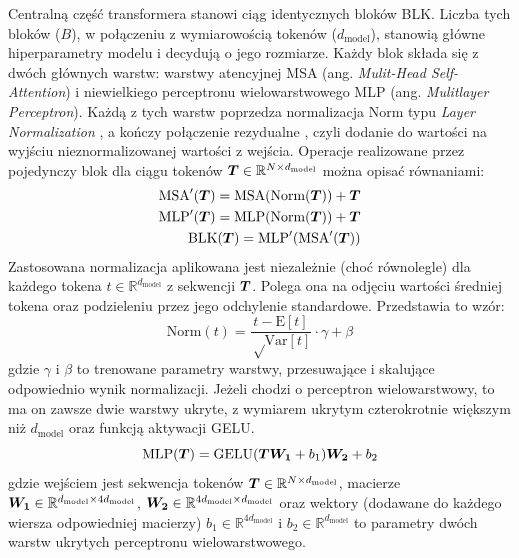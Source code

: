 Centralną część transformera stanowi ciąg identycznych bloków BLK. Liczba tych bloków ($B$), w połączeniu z wymiarowością tokenów ($d_{\mathrm{model}}$), stanowią główne hiperparametry modelu i decydują o jego rozmiarze. Każdy blok składa się z dwóch głównych warstw: warstwy atencyjnej MSA (ang. \emph{Mulit-Head Self-Attention}) i niewielkiego perceptronu wielowarstwowego MLP (ang.  \emph{Mulitlayer Perceptron}). Każdą z tych warstw poprzedza normalizacja Norm typu \emph{Layer Normalization} \cite{ba_layer_2016}, a kończy połączenie rezydualne \cite{he_deep_2015}, czyli dodanie do wartości na wyjściu nieznormalizowanej wartości z wejścia. Operacje realizowane przez pojedynczy blok dla ciągu tokenów $\boldsymbol{T} \in \mathbb{R}^{N \times d_{\mathrm{model}}}$ można opisać równaniami:
\begin{eqnarray}
     \textrm{MSA}'(\boldsymbol{T}) = \textrm{MSA}(\textrm{Norm}(\boldsymbol{T})) + \boldsymbol{T} \\
     \textrm{MLP}'(\boldsymbol{T}) = \textrm{MLP}(\textrm{Norm}(\boldsymbol{T})) + \boldsymbol{T} \\
     \textrm{BLK}(\boldsymbol{T}) = \textrm{MLP}'(\textrm{MSA}'(\boldsymbol{T}))
\end{eqnarray}
Zastosowana normalizacja aplikowana jest niezależnie (choć równolegle) dla każdego tokena $t \in \mathbb{R}^{d_{\mathrm{model}}}$ z sekwencji $\boldsymbol{T}$. Polega ona na odjęciu wartości średniej tokena oraz podzieleniu przez jego odchylenie standardowe. Przedstawia to wzór:
\begin{equation}
    \textrm{Norm}(t) = \frac{t - \textrm{E}[t]}{\sqrt \textrm{Var}[t]} \cdot \gamma + \beta
\end{equation}
gdzie $\gamma$ i $\beta$ to trenowane parametry warstwy, przesuwające i skalujące odpowiednio wynik normalizacji. Jeżeli chodzi o perceptron wielowarstwowy, to ma on zawsze dwie warstwy ukryte, z wymiarem ukrytym czterokrotnie większym niż $d_{\mathrm{model}}$ oraz funkcją aktywacji GELU.
\begin{equation}
    \textrm{MLP}(\boldsymbol{T}) = \textrm{GELU}(\boldsymbol{T}\boldsymbol{W_1} + b_1)\boldsymbol{W_2} + b_2
\end{equation}
gdzie wejściem jest sekwencja tokenów $\boldsymbol{T} \in \mathbb{R}^{N \times d_{\mathrm{model}}}$, macierze $\boldsymbol{W_1} \in \mathbb{R}^{d_{\mathrm{model}} \times 4d_{\mathrm{model}}}$, $\boldsymbol{W_2} \in \mathbb{R}^{4d_{\mathrm{model}} \times d_{\mathrm{model}}}$ oraz wektory (dodawane do każdego wiersza odpowiedniej macierzy) $b_1 \in \mathbb{R}^{4d_{\mathrm{model}}}$ i $b_2 \in \mathbb{R}^{d_{\mathrm{model}}}$ to parametry dwóch warstw ukrytych perceptronu wielowarstwowego.

